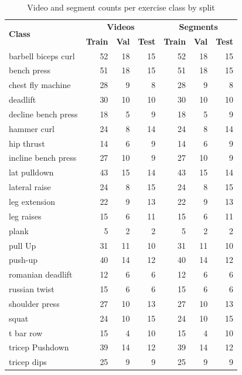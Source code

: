 \documentclass[runningheads]{llncs}
\begin{document}
\begin{table}[!h]
\centering
\caption{Video and segment counts per exercise class by split}
\label{tab:counts-per-class}
\begin{tabular}{l r r r | r r r}
\hline
\multirow{2}{*}{\textbf{Class}}   & \multicolumn{3}{c|}{\textbf{Videos}} & \multicolumn{3}{c}{\textbf{Segments}} \\
  & \textbf{Train} & \textbf{Val} & \textbf{Test} & \textbf{Train} & \textbf{Val} & \textbf{Test} \\
\hline
barbell biceps curl    & 52  & 18  & 15  & 52  & 18  & 15  \\
bench press            & 51  & 18  & 15  & 51  & 18  & 15  \\
chest fly machine      & 28  & 9   & 8   & 28  & 9   & 8   \\
deadlift               & 30  & 10  & 10  & 30  & 10  & 10  \\
decline bench press    & 18  & 5   & 9   & 18  & 5   & 9   \\
hammer curl            & 24  & 8   & 14  & 24  & 8   & 14  \\
hip thrust             & 14  & 6   & 9   & 14  & 6   & 9   \\
incline bench press    & 27  & 10  & 9   & 27  & 10  & 9   \\
lat pulldown           & 43  & 15  & 14  & 43  & 15  & 14  \\
lateral raise          & 24  & 8   & 15  & 24  & 8   & 15  \\
leg extension          & 22  & 9   & 13  & 22  & 9   & 13  \\
leg raises             & 15  & 6   & 11  & 15  & 6   & 11  \\
plank                  & 5   & 2   & 2   & 5   & 2   & 2   \\
pull Up                & 31  & 11  & 10  & 31  & 11  & 10  \\
push-up                & 40  & 14  & 12  & 40  & 14  & 12  \\
romanian deadlift      & 12  & 6   & 6   & 12  & 6   & 6   \\
russian twist          & 15  & 6   & 6   & 15  & 6   & 6   \\
shoulder press         & 27  & 10  & 13  & 27  & 10  & 13  \\
squat                  & 24  & 10  & 15  & 24  & 10  & 15  \\
t bar row              & 15  & 4   & 10  & 15  & 4   & 10  \\
tricep Pushdown        & 39  & 14  & 12  & 39  & 14  & 12  \\
tricep dips            & 25  & 9   & 9   & 25  & 9   & 9   \\
\hline
\end{tabular}
\end{table}
\end{document}
